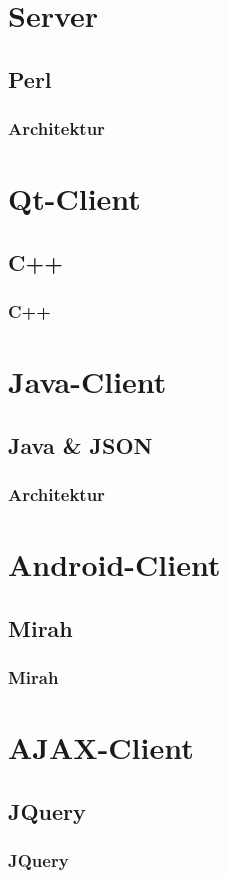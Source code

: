 \documentclass{beamer}
\begin{document}
\section{Server}

\subsection{Perl}
\begin{frame}[fragile]
\frametitle{Architektur}

\end{frame}

\section{Qt-Client}

\subsection{C++}
\begin{frame}[fragile]
\frametitle{C++}
\end{frame}

\section{Java-Client}

\subsection{Java \& JSON}
\begin{frame}[fragile]
\frametitle{Architektur}
\end{frame}

\section{Android-Client}

\subsection{Mirah}
\begin{frame}[fragile]
\frametitle{Mirah}
\end{frame}

\section{AJAX-Client}
\subsection{JQuery}
\begin{frame}[fragile]
\frametitle{JQuery}
\end{frame}
\end{document}
